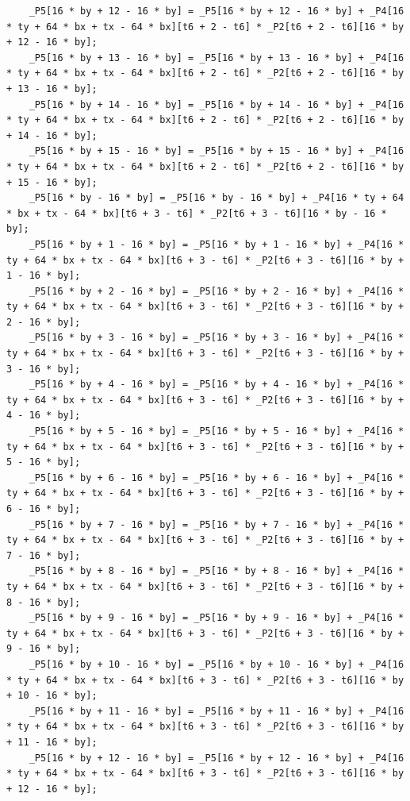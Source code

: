 \documentclass[msthesis,justified,copyright,final,numbers,sort&compress,
gsmodern,amstex,natbib]{uothesis}
\begin{document}
\begin{lstlisting}
    _P5[16 * by + 12 - 16 * by] = _P5[16 * by + 12 - 16 * by] + _P4[16 * ty + 64 * bx + tx - 64 * bx][t6 + 2 - t6] * _P2[t6 + 2 - t6][16 * by + 12 - 16 * by];
    _P5[16 * by + 13 - 16 * by] = _P5[16 * by + 13 - 16 * by] + _P4[16 * ty + 64 * bx + tx - 64 * bx][t6 + 2 - t6] * _P2[t6 + 2 - t6][16 * by + 13 - 16 * by];
    _P5[16 * by + 14 - 16 * by] = _P5[16 * by + 14 - 16 * by] + _P4[16 * ty + 64 * bx + tx - 64 * bx][t6 + 2 - t6] * _P2[t6 + 2 - t6][16 * by + 14 - 16 * by];
    _P5[16 * by + 15 - 16 * by] = _P5[16 * by + 15 - 16 * by] + _P4[16 * ty + 64 * bx + tx - 64 * bx][t6 + 2 - t6] * _P2[t6 + 2 - t6][16 * by + 15 - 16 * by];
    _P5[16 * by - 16 * by] = _P5[16 * by - 16 * by] + _P4[16 * ty + 64 * bx + tx - 64 * bx][t6 + 3 - t6] * _P2[t6 + 3 - t6][16 * by - 16 * by];
    _P5[16 * by + 1 - 16 * by] = _P5[16 * by + 1 - 16 * by] + _P4[16 * ty + 64 * bx + tx - 64 * bx][t6 + 3 - t6] * _P2[t6 + 3 - t6][16 * by + 1 - 16 * by];
    _P5[16 * by + 2 - 16 * by] = _P5[16 * by + 2 - 16 * by] + _P4[16 * ty + 64 * bx + tx - 64 * bx][t6 + 3 - t6] * _P2[t6 + 3 - t6][16 * by + 2 - 16 * by];
    _P5[16 * by + 3 - 16 * by] = _P5[16 * by + 3 - 16 * by] + _P4[16 * ty + 64 * bx + tx - 64 * bx][t6 + 3 - t6] * _P2[t6 + 3 - t6][16 * by + 3 - 16 * by];
    _P5[16 * by + 4 - 16 * by] = _P5[16 * by + 4 - 16 * by] + _P4[16 * ty + 64 * bx + tx - 64 * bx][t6 + 3 - t6] * _P2[t6 + 3 - t6][16 * by + 4 - 16 * by];
    _P5[16 * by + 5 - 16 * by] = _P5[16 * by + 5 - 16 * by] + _P4[16 * ty + 64 * bx + tx - 64 * bx][t6 + 3 - t6] * _P2[t6 + 3 - t6][16 * by + 5 - 16 * by];
    _P5[16 * by + 6 - 16 * by] = _P5[16 * by + 6 - 16 * by] + _P4[16 * ty + 64 * bx + tx - 64 * bx][t6 + 3 - t6] * _P2[t6 + 3 - t6][16 * by + 6 - 16 * by];
    _P5[16 * by + 7 - 16 * by] = _P5[16 * by + 7 - 16 * by] + _P4[16 * ty + 64 * bx + tx - 64 * bx][t6 + 3 - t6] * _P2[t6 + 3 - t6][16 * by + 7 - 16 * by];
    _P5[16 * by + 8 - 16 * by] = _P5[16 * by + 8 - 16 * by] + _P4[16 * ty + 64 * bx + tx - 64 * bx][t6 + 3 - t6] * _P2[t6 + 3 - t6][16 * by + 8 - 16 * by];
    _P5[16 * by + 9 - 16 * by] = _P5[16 * by + 9 - 16 * by] + _P4[16 * ty + 64 * bx + tx - 64 * bx][t6 + 3 - t6] * _P2[t6 + 3 - t6][16 * by + 9 - 16 * by];
    _P5[16 * by + 10 - 16 * by] = _P5[16 * by + 10 - 16 * by] + _P4[16 * ty + 64 * bx + tx - 64 * bx][t6 + 3 - t6] * _P2[t6 + 3 - t6][16 * by + 10 - 16 * by];
    _P5[16 * by + 11 - 16 * by] = _P5[16 * by + 11 - 16 * by] + _P4[16 * ty + 64 * bx + tx - 64 * bx][t6 + 3 - t6] * _P2[t6 + 3 - t6][16 * by + 11 - 16 * by];
    _P5[16 * by + 12 - 16 * by] = _P5[16 * by + 12 - 16 * by] + _P4[16 * ty + 64 * bx + tx - 64 * bx][t6 + 3 - t6] * _P2[t6 + 3 - t6][16 * by + 12 - 16 * by];

\end{lstlisting}
\end{document}
